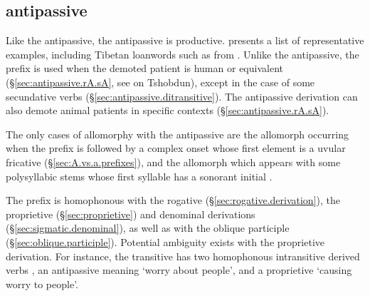 \subsection{ antipassive} \label{sec:antipassive.sA}
Like the  antipassive, the  antipassive is productive.  presents a list of representative examples, including Tibetan loanwords such as   from  . Unlike the  antipassive, the   prefix is used when the demoted patient is  human or equivalent (§\ref{sec:antipassive.rA.sA}, see \citealt[8]{jackson06paisheng} on Tshobdun), except in the case of some secundative verbs (§\ref{sec:antipassive.ditransitive}). The  antipassive derivation can also demote animal patients in specific contexts (§\ref{sec:antipassive.rA.sA}).

The only cases of allomorphy with the antipassive  are the allomorph  occurring when the prefix is followed by a complex onset whose first  element is a uvular fricative (§\ref{sec:A.vs.a.prefixes}), and the allomorph  which appears with some polysyllabic stems whose first syllable has a sonorant initial .

The  prefix is homophonous with the rogative (§\ref{sec:rogative.derivation}), the proprietive (§\ref{sec:proprietive}) and denominal derivations (§\ref{sec:sigmatic.denominal}), as well as with the oblique participle  (§\ref{sec:oblique.participle}). Potential ambiguity exists with the proprietive derivation. For instance, the transitive  has two homophonous intransitive derived verbs , an antipassive meaning `worry about people', and a proprietive `causing worry to people'.

